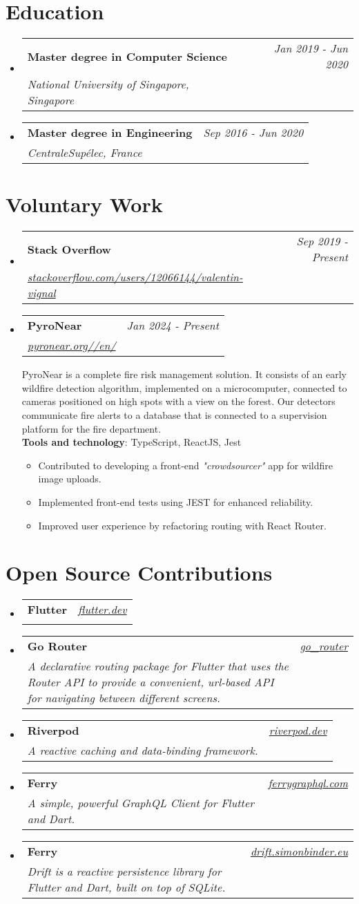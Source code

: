 \documentclass[a4paper,11pt]{article}
\newcommand{\cvHeading}[3]{
\vspace{0.5mm}\item
    \begin{tabularx}{0.98\textwidth}[t]{X r}
        \textbf{#1} & \textit{\footnotesize{#2}} \\
        \textit{\footnotesize{#3}} &  {}\\
    \end{tabularx}
    \vspace{-2.4mm}
}
\newcommand{\cvHeadingListStart}{\begin{itemize}[leftmargin=*,labelsep=0mm]}
\newcommand{\cvHeadingListEnd}{\end{itemize}\vspace{2mm}}
\newcommand{\cvItemListStart}{\begin{justify}\begin{itemize}[leftmargin=3ex, rightmargin=2ex, noitemsep,labelsep=1.2mm,itemsep=0mm]\small}
\newcommand{\cvItemListEnd}{\end{itemize}\end{justify}\vspace{-2mm}}
\begin{document}
\section{\textbf{Education}}
\cvHeadingListStart
\cvHeading
{Master degree in Computer Science}{Jan 2019 - Jun 2020}
{National University of Singapore, Singapore}
\cvHeading
{Master degree in Engineering}{Sep 2016 - Jun 2020}
{CentraleSupélec, France}
\cvHeadingListEnd

\section{\textbf{Voluntary Work}}
\cvHeadingListStart
\cvHeading
{Stack Overflow}{Sep
  2019 - Present}
{\href{https://stackoverflow.com/users/12066144/valentin-vignal}{stackoverflow.com/users/12066144/valentin-vignal}}
\cvHeading {PyroNear}{Jan 2024 - Present}
{\href{https://pyronear.org//en/}{pyronear.org//en/}}

{\footnotesize PyroNear is a complete fire risk management
  solution. It consists of an early wildfire detection algorithm, implemented on a
  microcomputer, connected to cameras positioned on high spots with a view on the
  forest. Our detectors communicate fire alerts to a database that is connected to
  a supervision platform for the fire department.} \\
\small \textbf{Tools and technology}: {\footnotesize TypeScript, ReactJS, Jest}
\cvItemListStart
\item Contributed to developing a front-end \textit{"crowdsourcer"} app for wildfire image uploads.
\item Implemented front-end tests using JEST for enhanced reliability.
\item Improved user experience by refactoring routing with React Router.
\cvItemListEnd
\cvHeadingListEnd


\section{\textbf{Open Source Contributions}}
\cvHeadingListStart
\cvHeading
{Flutter}{\href{https://flutter.dev/}{flutter.dev}}{}
\cvHeading
{Go Router}{\href{https://pub.dev/packages/go_router}{go\_router}}
{A declarative routing package for Flutter that uses the Router API to provide a convenient, url-based API for navigating between different screens.}
\cvHeading{Riverpod}{\href{https://riverpod.dev/}{riverpod.dev}}{A reactive caching and data-binding framework.}
\cvHeading{Ferry}{\href{https://ferrygraphql.com/}{ferrygraphql.com}}{A simple, powerful GraphQL Client for Flutter and Dart.}
\cvHeading{Ferry}{\href{https://drift.simonbinder.eu/}{drift.simonbinder.eu}}{Drift is a reactive persistence library for Flutter and Dart, built on top of SQLite.}
\cvHeadingListEnd
\end{document}
